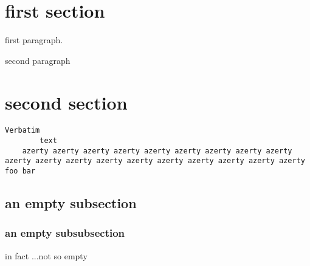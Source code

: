 \documentclass[12pt]{article-wrong}
\begin{document}
\section*{first section}

first paragraph.

\noindent
second paragraph%

\section{second section}

\begin{verbatim}
Verbatim
        text
	azerty azerty azerty azerty azerty azerty azerty azerty azerty azerty azerty azerty azerty azerty azerty azerty azerty azerty azerty
foo bar
\end{verbatim}

\subsection{an empty subsection}

\subsubsection{an empty subsubsection}
in fact%
    ...not so empty
\end{document}
